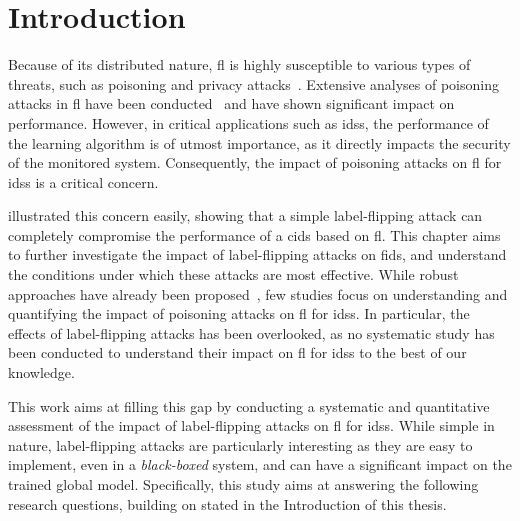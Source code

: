 \section{Introduction\label{sec:assess.intro}}

Because of its distributed nature, \gls{fl} is highly susceptible to various types of threats, such as poisoning and privacy attacks~\cite{rodriguez-barroso_Surveyfederatedlearning_2023}.
Extensive analyses of poisoning attacks in \gls{fl} have been conducted~\cite{bhagoji_AnalyzingFederatedLearning_2019,tolpegin_DataPoisoningAttacks_2020} and have shown significant impact on performance.
However, in critical applications such as \glspl{ids}, the performance of the learning algorithm is of utmost importance, as it directly impacts the security of the monitored system.
Consequently, the impact of poisoning attacks on \gls{fl} for \glspl{ids} is a critical concern.

 illustrated this concern easily, showing that a simple label-flipping attack can completely compromise the performance of a \gls{cids} based on \gls{fl}.
This chapter aims to further investigate the impact of label-flipping attacks on \gls{fids}, and understand the conditions under which these attacks are most effective.
While robust approaches have already been proposed~\cite{yang_Dependablefederatedlearning_2023,vy_FederatedLearningBasedIntrusion_2021,zhang_SecFedNIDSRobustdefense_2022}, few studies focus on understanding and quantifying the impact of poisoning attacks on \gls{fl} for \glspl{ids}.
In particular, the effects of label-flipping attacks has been overlooked, as no systematic study has been conducted to understand their impact on \gls{fl} for \glspl{ids} to the best of our knowledge.

This work aims at filling this gap by conducting a systematic and quantitative assessment of the impact of label-flipping attacks on \gls{fl} for \glspl{ids}.
While simple in nature, label-flipping attacks are particularly interesting as they are easy to implement, even in a \emph{black-boxed} system, and can have a significant impact on the trained global model.
Specifically, this study aims at answering the following research questions, building on  stated in the Introduction of this thesis.

